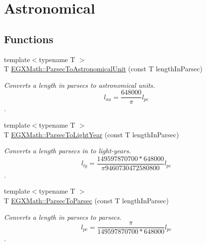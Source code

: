 \hypertarget{group___e_g_x_math-_conversions-_length_conversions-_astronomical-_parsec-_astronomical}{}\section{Astronomical}
\label{group___e_g_x_math-_conversions-_length_conversions-_astronomical-_parsec-_astronomical}
\subsection*{Functions}
\begin{DoxyCompactItemize}
\item 
{\footnotesize template$<$typename T $>$ }\\T \mbox{\hyperlink{group___e_g_x_math-_conversions-_length_conversions-_astronomical-_parsec-_astronomical_ga635dd871156c8bdd5e27198ba323380c}{E\+G\+X\+Math\+::\+Parsec\+To\+Astronomical\+Unit}} (const T length\+In\+Parsec)
\begin{DoxyCompactList}\small\item\em Converts a length in parsecs to astronomical units. \[ l_{au}= \frac{648000}{\pi} l_{pc} \]. \end{DoxyCompactList}\item 
{\footnotesize template$<$typename T $>$ }\\T \mbox{\hyperlink{group___e_g_x_math-_conversions-_length_conversions-_astronomical-_parsec-_astronomical_gaf6681b9c24d89c83c48bf6dabb9a433d}{E\+G\+X\+Math\+::\+Parsec\+To\+Light\+Year}} (const T length\+In\+Parsec)
\begin{DoxyCompactList}\small\item\em Converts a length parsecs in to light-\/years. \[ l_{ly}= \frac{149597870700 * 648000}{\pi 9460730472580800} l_{pc} \]. \end{DoxyCompactList}\item 
{\footnotesize template$<$typename T $>$ }\\T \mbox{\hyperlink{group___e_g_x_math-_conversions-_length_conversions-_astronomical-_parsec-_astronomical_gaf26b93b0097631545621d26c5a1366fc}{E\+G\+X\+Math\+::\+Parsec\+To\+Parsec}} (const T length\+In\+Parsec)
\begin{DoxyCompactList}\small\item\em Converts a length in parsecs to parsecs. \[ l_{pc}=\frac{\pi}{149597870700 * 648000} l_{pc} \]. \end{DoxyCompactList}\end{DoxyCompactItemize}


